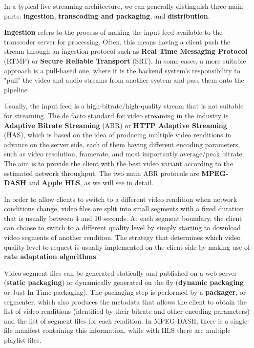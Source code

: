 In a typical live streaming architecture, we can generally distinguish three main parts: \textbf{ingestion}, \textbf{transcoding and packaging}, and \textbf{distribution}.


\textbf{Ingestion} refers to the process of making the input feed available to the transcoder server for processing. Often, this means having a client push the stream through an ingestion protocol such as \textbf{Real Time Messaging Protocol} (RTMP) or \textbf{Secure Reliable Transport} (SRT). In some cases, a more suitable approach is a pull-based one, where it is the backend system's responsibility to "pull" the video and audio streams from another system and pass them onto the pipeline.

Usually, the input feed is a high-bitrate/high-quality stream that is not suitable for streaming. The de facto standard for video streaming in the industry is \textbf{Adaptive Bitrate Streaming} (ABR) or \textbf{HTTP Adaptive Streaming} (HAS), which is based on the idea of producing multiple video renditions in advance on the server side, each of them having different encoding parameters, such as video resolution, framerate, and most importantly average/peak bitrate. The aim is to provide the client with the best video variant according to the estimated network throughput. The two main ABR protocols are \textbf{MPEG-DASH} and \textbf{Apple HLS}, as we will see in detail.

In order to allow clients to switch to a different video rendition when network conditions change, video files are split into small segments with a fixed duration that is usually between 4 and 10 seconds. At each segment boundary, the client can choose to switch to a different quality level by simply starting to download video segments of another rendition. The strategy that determines which video quality level to request is usually implemented on the client side by making use of \textbf{rate adaptation algorithms}.

Video segment files can be generated statically and published on a web server (\textbf{static packaging}) or dynamically generated on the fly (\textbf{dynamic packaging} or Just-In-Time packaging). The packaging step is performed by a \textbf{packager}, or segmenter, which also produces the metadata that allows the client to obtain the list of video renditions (identified by their bitrate and other encoding parameters) and the list of segment files for each rendition. In MPEG-DASH, there is a single-file manifest containing this information, while with HLS there are multiple playlist files.

